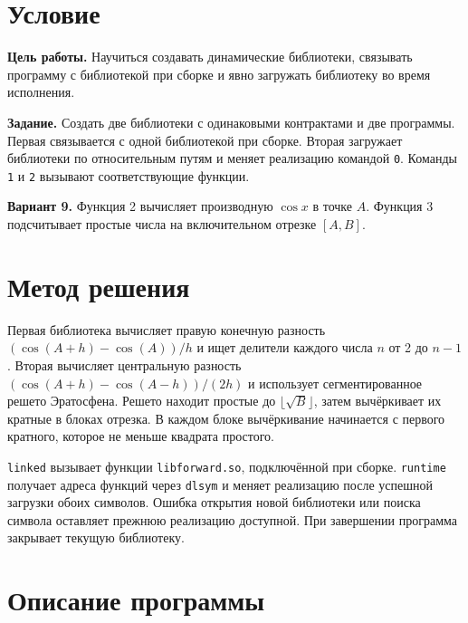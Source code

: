 \documentclass[12pt,a4paper]{article}
\begin{document}


\section{Условие}
\textbf{Цель работы.} Научиться создавать динамические библиотеки, связывать программу с библиотекой при сборке и явно загружать библиотеку во время исполнения.

\textbf{Задание.} Создать две библиотеки с одинаковыми контрактами и две программы. Первая связывается с одной библиотекой при сборке. Вторая загружает библиотеки по относительным путям и меняет реализацию командой \texttt{0}. Команды \texttt{1} и \texttt{2} вызывают соответствующие функции.

\textbf{Вариант 9.} Функция 2 вычисляет производную $\cos x$ в точке $A$. Функция 3 подсчитывает простые числа на включительном отрезке $[A,B]$.

\section{Метод решения}
Первая библиотека вычисляет правую конечную разность $(\cos(A+h)-\cos(A))/h$ и ищет делители каждого числа $n$ от 2 до $n-1$. Вторая вычисляет центральную разность $(\cos(A+h)-\cos(A-h))/(2h)$ и использует сегментированное решето Эратосфена. Решето находит простые до $\lfloor\sqrt{B}\rfloor$, затем вычёркивает их кратные в блоках отрезка. В каждом блоке вычёркивание начинается с первого кратного, которое не меньше квадрата простого.

\texttt{linked} вызывает функции \texttt{libforward.so}, подключённой при сборке. \texttt{runtime} получает адреса функций через \texttt{dlsym} и меняет реализацию после успешной загрузки обоих символов. Ошибка открытия новой библиотеки или поиска символа оставляет прежнюю реализацию доступной. При завершении программа закрывает текущую библиотеку.

\section{Описание программы}
\end{document}
